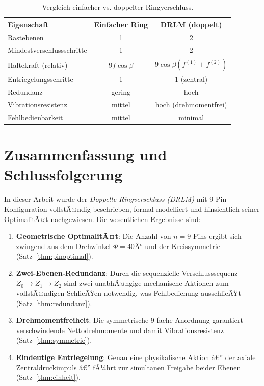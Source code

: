 ﻿\documentclass[12pt, a4paper]{article}
\theoremstyle{remark}
\begin{document}
\begin{table}[H]
  \centering
  \caption{Vergleich einfacher vs. doppelter Ringverschluss.}
  \label{tab:vergleich}
  \begin{tabular}{lcc}
    \toprule
    \textbf{Eigenschaft} & \textbf{Einfacher Ring} & \textbf{DRLM (doppelt)} \\
    \midrule
    Rastebenen & 1 & 2 \\
    Mindestverschlussschritte & 1 & 2 \\
    Haltekraft (relativ) & $9f\cos\beta$ & $9\cos\beta(f^{(1)}+f^{(2)})$ \\
    Entriegelungsschritte & 1 & 1 (zentral) \\
    Redundanz & gering & hoch \\
    Vibrationsresistenz & mittel & hoch (drehmomentfrei) \\
    Fehlbedienbarkeit & mittel & minimal \\
    \bottomrule
  \end{tabular}
\end{table}

\section{Zusammenfassung und Schlussfolgerung}

In dieser Arbeit wurde der \emph{Doppelte Ringverschluss (DRLM)} mit 9-Pin-Konfiguration
vollstÃ¤ndig beschrieben, formal modelliert und hinsichtlich seiner OptimalitÃ¤t nachgewiesen.
Die wesentlichen Ergebnisse sind:

\begin{enumerate}
  \item \textbf{Geometrische OptimalitÃ¤t}: Die Anzahl von $n = 9$ Pins ergibt sich zwingend
        aus dem Drehwinkel $\Phi = 40Â°$ und der Kreissymmetrie (Satz~\ref{thm:pinoptimal}).

  \item \textbf{Zwei-Ebenen-Redundanz}: Durch die sequenzielle Verschlusssequenz
        $Z_0 \to Z_1 \to Z_2$ sind zwei unabhÃ¤ngige mechanische Aktionen zum vollstÃ¤ndigen
        SchlieÃŸen notwendig, was Fehlbedienung ausschlieÃŸt (Satz~\ref{thm:redundanz}).

  \item \textbf{Drehmomentfreiheit}: Die symmetrische 9-fache Anordnung garantiert
        verschwindende Nettodrehmomente und damit Vibrationsresistenz (Satz~\ref{thm:symmetrie}).

  \item \textbf{Eindeutige Entriegelung}: Genau eine physikalische Aktion â€” der axiale
        Zentraldruckimpuls â€” fÃ¼hrt zur simultanen Freigabe beider Ebenen (Satz~\ref{thm:einheit}).
\end{enumerate}
\end{document}
